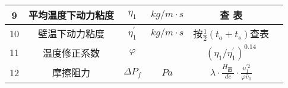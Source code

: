 \begin{table}[H]
{\begin{tabular}{|c|c|c|c|c|c|}
            9    & 平均温度下动力粘度 & $ \eta_{1} $       & $ kg/m \cdot s $                               & 查 表                                                                                            &      \\ \hline
            10   & 壁温下动力粘度     & $ \eta_{1}^{'} $   & $ kg/m \cdot s $                               & 按$ \frac{1}{2}(t_a + t_s) $查表                                                                 &      \\ \hline
            11   & 温度修正系数       & $ \varphi $        &                                                & $ \left(\eta_{1} / \eta_{1}^{\prime}\right)^{0.14} $                                             &      \\ \hline
            12   & 摩擦阻力           & $ \Delta P_f $     & $ Pa $                                         & $ \lambda \cdot \frac{H_{\text {直 }}}{d e} \cdot \frac{u_{1}^{\prime 2}}{\varphi \bar{v}_{1}} $ &      \\ \hline
        \end{tabular}
    }
\end{table}

